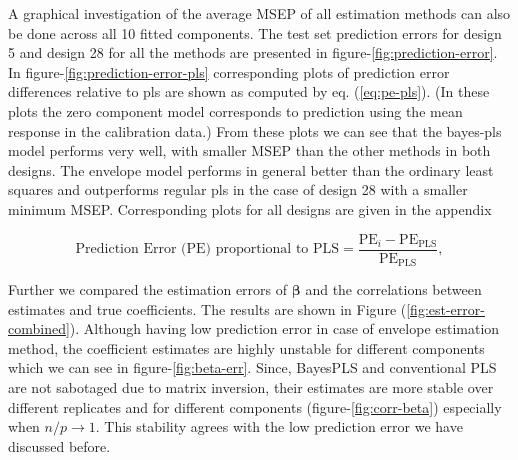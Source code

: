 \documentclass[a4paper, 11pt]{article}
\begin{document}
A graphical investigation of the average MSEP of all estimation methods can also be done across all 10 fitted components. The test set prediction errors for design 5 and design 28 for all the methods are presented in figure-\ref{fig:prediction-error}. In figure-\ref{fig:prediction-error-pls} corresponding plots of prediction error differences relative to pls are shown as computed by eq. (\ref{eq:pe-pls}). (In these plots the zero component model corresponds to prediction using the mean response in the calibration data.) From these plots we can see that the bayes-pls model performs very well, with smaller MSEP than the other methods in both designs. The envelope model performs in general better than the ordinary least squares and outperforms regular pls in the case of design 28 with a smaller minimum MSEP. Corresponding plots for all designs are given in the appendix %


\begin{equation}
  \label{eq:pe-pls}
  \text{Prediction Error (PE) proportional to PLS} =
  \frac{\text{PE}_i - \text{PE}_\text{PLS}}{\text{PE}_\text{PLS}},
\end{equation}


Further we compared the estimation errors of $\boldsymbol{\beta}$ and the correlations between estimates and true coefficients. The results are shown in Figure (\ref{fig:est-error-combined}). Although having low prediction error in case of envelope estimation method, the coefficient estimates are highly unstable for different components which we can see in figure-\ref{fig:beta-err}. Since, BayesPLS and conventional PLS are not sabotaged due to matrix inversion, their estimates are more stable over different replicates and for different components (figure-\ref{fig:corr-beta}) especially when $n/p \rightarrow 1$. This stability agrees with the low prediction error we have discussed before.
\end{document}
